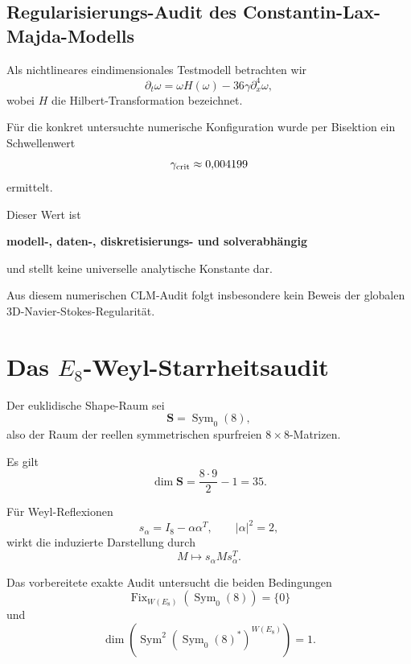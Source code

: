 \documentclass[11pt,twoside,a4paper]{article}
\begin{document}
	\subsection{Regularisierungs-Audit des Constantin-Lax-Majda-Modells}
	
	Als nichtlineares eindimensionales Testmodell betrachten wir
	\begin{equation}
		\partial_t\omega
		=
		\omega H(\omega)
		-
		36\gamma
		\partial_x^4\omega,
	\end{equation}
	wobei $H$ die Hilbert-Transformation bezeichnet.
	
	Für die konkret untersuchte numerische Konfiguration wurde per Bisektion ein Schwellenwert
	\begin{equation}
		\gamma_{\rm crit}
		\approx
		0{,}004199
	\end{equation}
	ermittelt.
	
	Dieser Wert ist
	\begin{center}
		\textbf{modell-, daten-, diskretisierungs- und solverabhängig}
	\end{center}
	und stellt keine universelle analytische Konstante dar.
	
	Aus diesem numerischen CLM-Audit folgt insbesondere kein Beweis der globalen 3D-Navier-Stokes-Regularität.
	
	\section{Das $E_8$-Weyl-Starrheitsaudit}
	
	Der euklidische Shape-Raum sei
	\begin{equation}
		\mathbf{S}
		=
		\operatorname{Sym}_0(8),
	\end{equation}
	also der Raum der reellen symmetrischen spurfreien $8\times8$-Matrizen.
	
	Es gilt
	\begin{equation}
		\dim\mathbf{S}
		=
		\frac{8\cdot9}{2}-1
		=
		35.
	\end{equation}
	
	Für Weyl-Reflexionen
	\begin{equation}
		s_\alpha
		=
		I_8
		-
		\alpha\alpha^T,
		\qquad
		|\alpha|^2=2,
	\end{equation}
	wirkt die induzierte Darstellung durch
	\begin{equation}
		M
		\mapsto
		s_\alpha
		M
		s_\alpha^T.
	\end{equation}
	
	Das vorbereitete exakte Audit untersucht die beiden Bedingungen
	\begin{equation}
		\operatorname{Fix}_{W(E_8)}
		\left(
		\operatorname{Sym}_0(8)
		\right)
		=
		\{0\}
	\end{equation}
	und
	\begin{equation}
		\dim
		\left(
		\operatorname{Sym}^2
		\left(
		\operatorname{Sym}_0(8)^*
		\right)^{W(E_8)}
		\right)
		=
		1.
	\end{equation}
	
\end{document}
